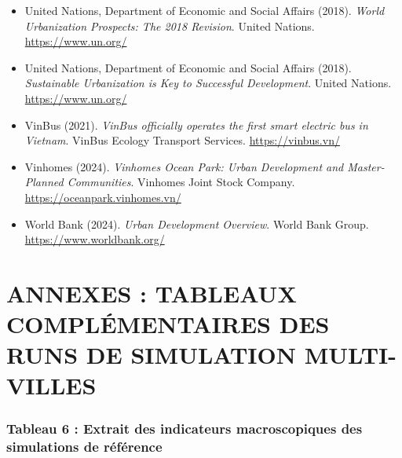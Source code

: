 \documentclass[10pt, a4paper]{article}
\begin{document}
\begin{itemize}
\item
  United Nations, Department of Economic and Social Affairs (2018).
  \emph{World Urbanization Prospects: The 2018 Revision}. United
  Nations. \url{https://www.un.org/}
\item
  United Nations, Department of Economic and Social Affairs (2018).
  \emph{Sustainable Urbanization is Key to Successful Development}.
  United Nations. \url{https://www.un.org/}
\item
  VinBus (2021). \emph{VinBus officially operates the first smart
  electric bus in Vietnam}. VinBus Ecology Transport Services.
  \url{https://vinbus.vn/}
\item
  Vinhomes (2024). \emph{Vinhomes Ocean Park: Urban Development and
  Master-Planned Communities}. Vinhomes Joint Stock Company.
  \url{https://oceanpark.vinhomes.vn/}
\item
  World Bank (2024). \emph{Urban Development Overview}. World Bank
  Group. \url{https://www.worldbank.org/}
\end{itemize}

\newpage

\section{ANNEXES : TABLEAUX COMPLÉMENTAIRES DES RUNS DE SIMULATION
MULTI-VILLES}\label{annexes-tableaux-compluxe9mentaires-des-runs-de-simulation-multi-villes}

\subsubsection{Tableau 6 : Extrait des indicateurs macroscopiques des
simulations de
référence}\label{tableau-6-extrait-des-indicateurs-macroscopiques-des-simulations-de-ruxe9fuxe9rence}
\end{document}
